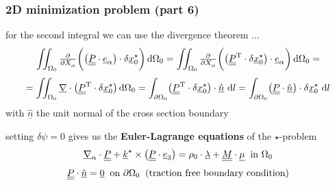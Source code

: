\begin{frame}
  \frametitle{2D minimization problem (part 6)}

  for the second integral we can use the divergence theorem ...
  \begin{displaymath}
    \iint_{\Omega_0}
      \pd{}{X_{\alpha}} \biggl( \bigl( \doubleunderline{P} \cdot \underline{e}_{\alpha} \bigr) \cdot \delta \underline{x}_0^{\star} \biggr)
    \dif \Omega_0 =
    \iint_{\Omega_0}
      \pd{}{X_{\alpha}} \biggl( \bigl( \doubleunderline{P}^{\mathrm{T}} \cdot \delta \underline{x}_0^{\star} \bigr) \cdot \underline{e}_{\alpha} \biggr)
    \dif \Omega_0 =
  \end{displaymath}
  \begin{displaymath}
    = \iint_{\Omega_0}
      \underline{\nabla} \cdot \bigl( \doubleunderline{P}^{\mathrm{T}} \cdot \delta \underline{x}_0^{\star} \bigr)
    \dif \Omega_0 =
    \int_{\partial \Omega_0}
      \bigl( \doubleunderline{P}^{\mathrm{T}} \cdot \delta \underline{x}_0^{\star} \bigr) \cdot \underline{\hat{n}} \,
    \dif l =
    \int_{\partial \Omega_0}
      \bigl( \doubleunderline{P} \cdot \underline{\hat{n}} \bigr) \cdot \delta \underline{x}_0^{\star} \,
    \dif l
  \end{displaymath}
  with $\underline{\hat{n}}$ the unit normal of the cross section boundary
  
  \vspace{1em}
  setting $\delta \psi = 0$ gives us the \textbf{Euler-Lagrange equations} of the $\star$-problem
  \begin{displaymath}
    \underline{\nabla}_{\alpha} \cdot \underline{\underline{P}} +
    \underline{k}^{\star} \times \bigl( \underline{\underline{P}} \cdot \underline{e}_3 \bigr) =
    \rho_0 \cdot \underline{\lambda} +
    \underline{\underline{M}} \cdot \underline{\mu}
    \: \text{ in } \Omega_0    
  \end{displaymath}
  \begin{displaymath}
    \underline{\underline{P}} \cdot \underline{\hat{n}} = \underline{0}
    \: \text{ on } \partial \Omega_0
    \: \text{ (traction free boundary condition)}
  \end{displaymath}
  
  \vspace{1em}


\end{frame}
